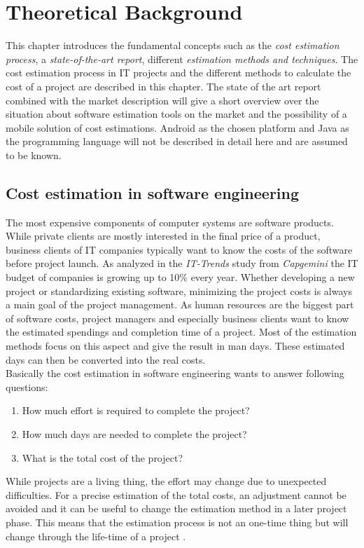 \chapter{Theoretical Background}

This chapter introduces the fundamental concepts such as the \textit{cost estimation process}, a \textit{state-of-the-art report}, different \textit{estimation methods and techniques}. The cost estimation process in IT projects and the different methods to calculate the cost of a project are described in this chapter. The state of the art report combined with the market description will give a short overview over the situation about software estimation tools on the market and the possibility of a mobile solution of cost estimations. Android as the chosen platform and Java as the programming language will not be described in detail here and are assumed to be known.

\section{Cost estimation in software engineering}

The most expensive components of computer systems are software products. While private clients are mostly interested in the final price of a product, business clients of IT companies typically want to know the costs of the software before project launch. As analyzed in the \textit{IT-Trends} study from \textit{Capgemini} \cite{capgemini} the IT budget of companies is growing up to 10\% every year. Whether developing a new project or standardizing existing software, minimizing the project costs is always a main goal of the project management. As human resources are the biggest part of software costs, project managers and especially business clients want to know the estimated spendings and completion time of a project. Most of the estimation methods focus on this aspect and give the result in man days. These estimated days can then be converted into the real costs.
\\
Basically the cost estimation in software engineering wants to answer following questions:
\begin{enumerate}
\item How much effort is required to complete the project?
\item How much days are needed to complete the project?
\item What is the total cost of the project?
\end{enumerate}
While projects are a living thing, the effort may change due to unexpected difficulties. For a precise estimation of the total costs, an adjustment cannot be avoided and it can be useful to change the estimation method in a later project phase. This means that the estimation process is not an one-time thing but will change through the life-time of a project \cite{itplanung}. 


